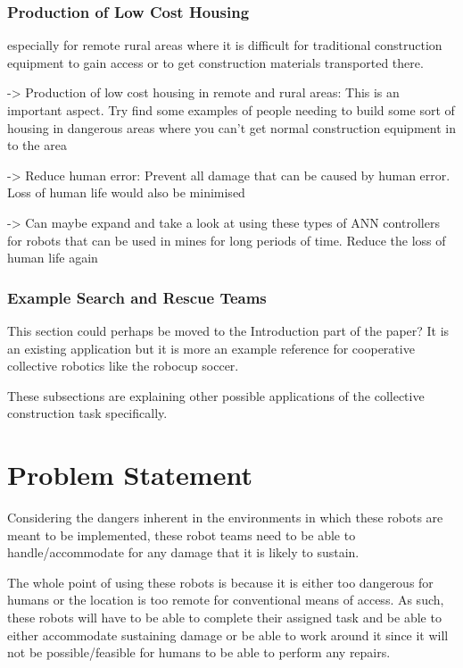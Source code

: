 \subsubsection{Production of Low Cost Housing}

especially for remote rural areas where it is difficult for traditional construction equipment to gain access or to get construction materials transported there.

-> Production of low cost housing in remote and rural areas: This is an important aspect. Try find some examples of people needing to build some sort of housing in dangerous areas where you can't get normal construction equipment in to the area

-> Reduce human error: Prevent all damage that can be caused by human error. Loss of human life would also be minimised

-> Can maybe expand and take a look at using these types of ANN controllers for robots that can be used in mines for long periods of time. Reduce the loss of human life again

\subsubsection{Example Search and Rescue Teams}
This section could perhaps be moved to the Introduction part of the paper? It is an existing application but it is more an example reference for cooperative collective robotics like the robocup soccer.

These subsections are explaining other possible applications of the collective construction task specifically.

\section{Problem Statement}

Considering the dangers inherent in the environments in which these robots are meant to be implemented, these robot teams need to be able to handle/accommodate for any damage that it is likely to sustain.


The whole point of using these robots is because it is either too dangerous for humans or the location is too remote for conventional means of access. As such, these robots will have to be able to complete their assigned task and be able to either accommodate sustaining damage or be able to work around it since it will not be possible/feasible for humans to be able to perform any repairs.


